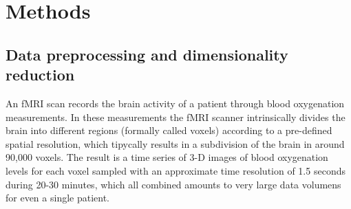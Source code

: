 \documentclass[fleqn,moreauthors,10pt]{ds_report}
\begin{document}
\iffalse    
    Using this data we can also build Functional Connectivity representations between brain regions, which has been shown to find important patterns in brain activity \cite{Matkovič_2024, Wang2021-ts}. One of such representations are connectivity-based graphs convolutional networks (cGCN) architecture for fMRI analysis, allowing the extraction of spatial features from connectomic neighborhoods, showing effectiveness in individual identification and classification of ASD patients in \cite{Wang2021-ts}. The proposed architecture was applied to supervised classification experiments using rs-fMRI data from the Human Connectome Project, showcasing its performance in identifying subjects based on their rs-fMRI data.

        In addition to the patient and control groups PANSS scores, the data is composed of a set of time series of 3D-images for each patient of different regions of the brain, from which we obtain a set of correlation-based connectivity features by finding the correlations between regions across time. We used two of such connectivity feature extraction methods, which has been proposed as imaging markers for several psychiatric disorders \cite{Kraus2020-ut}. Using this data we implemented several Machine learning models to build a binary classifier of sick or healthy patients. Then we escalated the analysis to a multi-label classifier of the different diagnosis of the patients.
\fi



\section*{Methods}
\label{sec:methods}

\subsection*{Data preprocessing and dimensionality reduction}

An fMRI scan records the brain activity of a patient through blood oxygenation measurements. In these measurements the fMRI scanner intrinsically divides the brain into different regions (formally called voxels) according to a pre-defined spatial resolution, which tipycally results in a subdivision of the brain in around 90,000 voxels. The result is a time series of 3-D images of blood oxygenation levels for each voxel sampled with an approximate time resolution of 1.5 seconds during 20-30 minutes, which all combined amounts to very large data volumens for even a single patient.  
\end{document}
